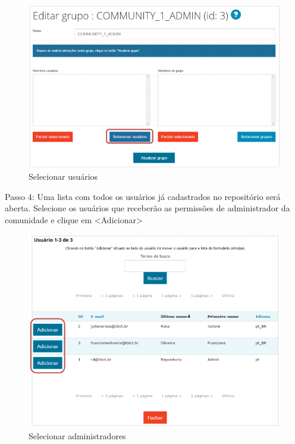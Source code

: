 \documentclass[12pt,hidelinks]{article}
\begin{document}
    \begin{figure}[!htp]
                \centering
                \includegraphics[scale=0.7]{figura/Figura20.png}
                \caption{Selecionar usuários}
            \label{Rotulo}
        \end{figure}
        
\newpage

    Passo 4: Uma lista com todos os usuários já cadastrados no repositório será aberta. Selecione os
    usuários que receberão as permissões de administrador da comunidade e clique em <Adicionar>
    
    \begin{figure}[!htp]
                \centering
                \includegraphics[scale=0.6]{figura/Figura21.png}
                \caption{Selecionar administradores}
            \label{Rotulo}
        \end{figure}
    
\end{document}
